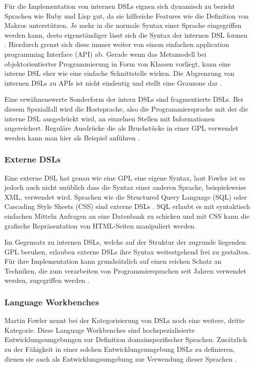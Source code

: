 \documentclass[12pt,oneside,a4paper,parskip]{scrbook}
\begin{document}
Für die Implementation von internen DSLs eignen sich dynamisch zu bezieht Sprachen wie Ruby und Lisp gut, da sie hilfreiche Features wie die Definition von Makros unterstützen. Je mehr in die normale Syntax einer Sprache eingegriffen werden kann, desto eigenständiger lässt sich die Syntax der internen DSL formen \cite[S. 98]{stahl2007}. Hierdurch grenzt sich diese immer weiter von einem einfachen application programming Interface (API) ab. Gerade wenn das Metamodell bei objektorientierter Programmierung in Form von Klassen vorliegt, kann eine interne DSL eher wie eine einfache Schnittstelle wirken. Die Abgrenzung von internen DSLs zu APIs ist nicht eindeutig und stellt eine Grauzone dar \cite[S. 67]{fowler2010}.

Eine erwähnenswerte Sonderform der intern DSLs sind fragmentierte DSLs. Bei diesem Spezialfall wird die Hostsprache, also die Programmiersprache mit der die interne DSL ausgedrückt wird, an einzelnen Stellen mit Informationen angereichert. Reguläre Ausdrücke die als Bruchstücke in einer GPL verwendet werden kann man hier als Beispiel anführen \cite[S. 32]{fowler2010}.

\subsubsection{Externe DSLs}

Eine externe DSL hat genau wie eine GPL eine eigene Syntax, laut Fowler ist es jedoch auch nicht unüblich dass die Syntax einer anderen Sprache, beispielsweise XML,  verwendet wird. Sprachen wie die Structured Query Language (SQL) oder Cascading Style Sheets (CSS) sind externe DSLs \cite[S. 28]{fowler2010}. SQL erlaubt es mit syntaktisch einfachen Mitteln Anfragen an eine Datenbank zu schicken und mit CSS kann die grafische Repräsentation von HTML-Seiten manipuliert werden.

Im Gegensatz zu internen DSLs, welche auf der Struktur der zugrunde liegenden GPL beruhen, erlauben externe DSLs ihre Syntax weitestgehend frei zu gestalten. Für ihre Implementation kann grundsätzlich auf einen reichen Schatz an Techniken, die zum verarbeiten von Programmiersprachen seit Jahren verwendet werden, zugegriffen werden \cite[S. 89]{fowler2010}.

\subsubsection{Language Workbenches}

Martin Fowler nennt bei der Kategorisierung von DSLs noch eine weitere, dritte Kategorie. Diese Language Workbenches sind hochspezialisierte Entwicklungsumgebungen zur Definition domainspezifischer Sprachen. Zusätzlich zu der Fähigkeit in einer solchen Entwicklungsumgebung DSLs zu definieren, dienen sie auch als Entwicklungsumgebung zur Verwendung dieser Sprachen \cite[S.28]{fowler2010}.
\end{document}
